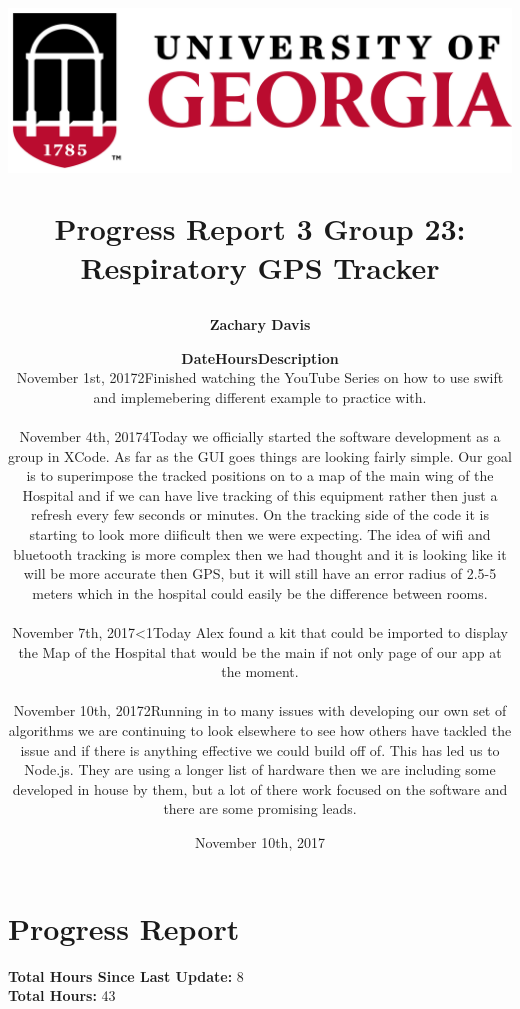 \documentclass[11pt]{report}
\title{
	\begin{center}
		\includegraphics[scale=0.5]{uga.PNG}\\
 	\end{center}
 	Progress Report 3
\bigbreak Group 23: Respiratory GPS Tracker
}
\author{\textbf{Zachary Davis}}
\date{November 10th, 2017}
\begin{document}
\maketitle

\section*{Progress Report}
	\begin{center}
		\author{
		{\normalsize
		\begin{tabular}{m{4cm} m{2cm} m{10cm}}
		\textbf{Date} & \textbf{Hours} & \textbf{Description}\\
		\hline
		November 1st, 2017 & 2 & Finished watching the YouTube Series on how to use swift and implemebering different example to practice with.\\
		&&\\
		November 4th, 2017 & 4 & Today we officially started the software development as a group in XCode.  As far as the GUI goes things are looking fairly simple.  Our goal is to superimpose the tracked positions on to a map of the main wing of the Hospital and if we can have live tracking of this equipment rather then just a refresh every few seconds or minutes.  On the tracking side of the code it is starting to look more diificult then we were expecting.  The idea of wifi and bluetooth tracking is more complex then we had thought and it is looking like it will be more accurate then GPS, but it will still have an error radius of 2.5-5 meters which in the hospital could easily be the difference between rooms.\\
		&&\\
		November 7th, 2017 & <1 & Today Alex found a kit that could be imported to display the Map of the Hospital that would be the main if not only page of our app at the moment.\\
		&&\\
		November 10th, 2017 & 2 & Running in to many issues with developing our own set of algorithms we are continuing to look elsewhere to see how others have tackled the issue and if there is anything effective we could build off of.  This has led us to Node.js.  They are using a longer list of hardware then we are including some developed in house by them, but a lot of there work focused on the software and there are some promising leads.
		\end{tabular}
		}
		}
	\end{center}
		\textbf{Total Hours Since Last Update: } 8\\
		\textbf{Total Hours: } 43
\end{document}
